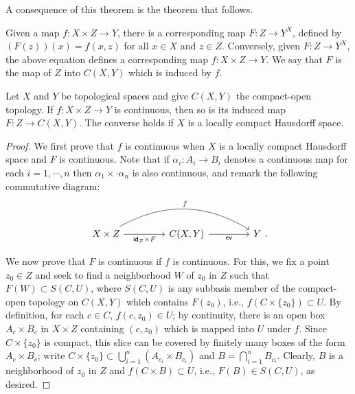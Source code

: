 A consequence of this theorem is the theorem that follows.
\begin{defi}
    Given a map $f: X\times Z\rightarrow Y$, there is a corresponding map $F: Z\rightarrow Y^X$, defined by $(F(z))(x)=f(x, z)$ for all $x\in X$ and $z\in Z$.
    Conversely, given $F: Z\rightarrow Y^X$, the above equation defines a corresponding map $f: X\times Z\rightarrow Y$.
    We say that $F$ is the map of $Z$ into $C(X, Y)$ which is induced by $f$.
\end{defi}
\begin{thm}
    Let $X$ and $Y$ be topological spaces and give $C(X, Y)$ the compact-open topology.
    If $f: X\times Z\rightarrow Y$ is continuous, then so is its induced map $F: Z\rightarrow C(X, Y)$.
    The converse holds if $X$ is a locally compact Hausdorff space.
\end{thm}
\begin{proof}
    We first prove that $f$ is continuous when $X$ is a locally compact Hausdorff space and $F$ is continuous.
    Note that if $\alpha_i: A_i\rightarrow B_i$ denotes a continuous map for each $i=1, \cdots, n$ then $\alpha_1\times\cdot\alpha_n$ is also continuous, and remark the following commutative diagram:
    \begin{equation*}
    \begin{tikzcd}[column sep=1.5cm]
        X\times Z
        \arrow[rr, bend left, "f"]
        \arrow[r, "\textsf{id}_Z\times F"']
        &
        C(X, Y)\arrow[r, "\textsf{ev}"']
        &
        Y
    \end{tikzcd}.
    \end{equation*}

    We now prove that $F$ is continuous if $f$ is continuous.
    For this, we fix a point $z_0\in Z$ and seek to find a neighborhood $W$ of $z_0$ in $Z$ such that $F(W)\subset S(C, U)$, where $S(C, U)$ is any subbasis member of the compact-open topology on $C(X, Y)$ which contains $F(z_0)$, i.e., $f(C\times\{z_0\})\subset U$.
    By definition, for each $c\in C$, $f(c, z_0)\in U$; by continuity, there is an open box $A_c\times B_c$ in $X\times Z$ containing $(c, z_0)$ which is mapped into $U$ under $f$.
    Since $C\times\{z_0\}$ is compact, this slice can be covered by finitely many boxes of the form $A_c\times B_c$; write $C\times\{z_0\}\subset\bigcup_{i=1}^n (A_{c_i}\times B_{c_i})$ and $B=\bigcap_{i=1}^n B_{c_i}$.
    Clearly, $B$ is a neighborhood of $z_0$ in $Z$ and $f(C\times B)\subset U$, i.e., $F(B)\in S(C, U)$, as desired.
\end{proof}
